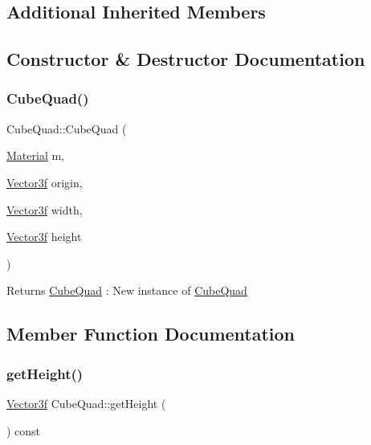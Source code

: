 \subsection*{Additional Inherited Members}


\subsection{Constructor \& Destructor Documentation}
\mbox{\label{class_cube_quad_a3fa4c62ac49699d72d1a8c8fdca2f2cb}} 
\subsubsection{\texorpdfstring{Cube\+Quad()}{CubeQuad()}}
{\footnotesize\ttfamily Cube\+Quad\+::\+Cube\+Quad (\begin{DoxyParamCaption}\item[{\mbox{\hyperlink{class_material}{Material}}}]{m,  }\item[{\mbox{\hyperlink{class_vector3f}{Vector3f}}}]{origin,  }\item[{\mbox{\hyperlink{class_vector3f}{Vector3f}}}]{width,  }\item[{\mbox{\hyperlink{class_vector3f}{Vector3f}}}]{height }\end{DoxyParamCaption})}

\begin{DoxyReturn}{Returns}
\mbox{\hyperlink{class_cube_quad}{Cube\+Quad}} \+: New instance of \mbox{\hyperlink{class_cube_quad}{Cube\+Quad}} 
\end{DoxyReturn}


\subsection{Member Function Documentation}
\mbox{\label{class_cube_quad_adfb45d0ba7d9fce02b6ee82a7872262f}} 
\subsubsection{\texorpdfstring{get\+Height()}{getHeight()}}
{\footnotesize\ttfamily \mbox{\hyperlink{class_vector3f}{Vector3f}} Cube\+Quad\+::get\+Height (\begin{DoxyParamCaption}{ }\end{DoxyParamCaption}) const\hspace{0.3cm}{\ttfamily [inline]}}

